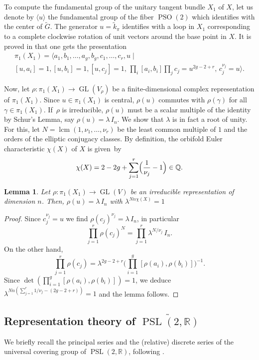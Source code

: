 \documentclass[JEP,XML,SOM,Unicode,NoFloatCountersInSection,published]{cedram}
\theoremstyle{plain}
\newtheorem{lem}[thm]{Lemma}
\theoremstyle{definition}
\theoremstyle{remark}
\newcommand{\R}{\mathbb{R}}
\newcommand{\Q}{\mathbb{Q}}
\DeclareMathOperator{\PSL}{PSL}
\DeclareMathOperator{\GL}{GL}
\DeclareMathOperator{\PSO}{PSO}
\numberwithin{equation}{section}
\begin{document}
To compute the fundamental group of the unitary tangent bundle $X_1$ of $X$, let us denote by $\langle u\rangle$ the fundamental group of the fiber $\PSO(2)$ which identifies with the center of $\widetilde{G}$. The generator $u=\widetilde{k}_\pi$ identifies with a loop in $X_1$ corresponding to a complete clockwise rotation of unit vectors around the base point in $X$. It is proved in \cite[\S 2]{fried1986fuchsian} that one gets the presentation
\begin{multline}\label{presentation}
\textstyle
\pi_1(X_1) = \bigl\langle a_1, b_1, \ldots, a_g, b_g, c_1, \ldots, c_r, u \mid \\ [u,a_i] =1, [u,b_i]=1, [u,c_j]=1, \, \prod_i[a_i,b_i]\prod_j c_j = u^{2g-2+r}, \, c_j^{\nu_j}=u \bigr\rangle.
\end{multline}

Now, let $\rho:\pi_1(X_1)\to\GL(V_\rho)$ be a finite-dimensional complex representation of $\pi_1(X_1)$. Since $u\in\pi_1(X_1)$ is central, $\rho(u)$ commutes with $\rho(\gamma)$ for all $\gamma\in\pi_1(X_1)$. If~$\rho$ is irreducible, $\rho(u)$ must be a scalar multiple of the identity by Schur's Lemma, say $\rho(u)=\lambda\,I_n$. We show that $\lambda$ is in fact a root of unity. For this, let $N = \operatorname{lcm}(1, \nu_1, \ldots, \nu_r)$ be the least common multiple of $1$ and the orders of the elliptic conjugacy classes. By definition, the orbifold Euler characteristic $\chi(X)$ of $X$ is given~by
\[
\chi(X) = 2-2g+\sum_{j=1}^r\Bigl(\frac 1 {\nu_j}-1\Bigr) \in \Q.
\]

\begin{lem}\label{lem:CenterActionIrredPi1X1}
Let $\rho\colon \pi_1(X_1) \to \GL(V)$ be an irreducible representation of dimension $n$. Then, $\rho(u) =\lambda\, I_n$ with $\lambda^{Nn\chi(X)}=1$
\end{lem}

\begin{proof}
Since $c_j^{\nu_j}=u$ we find
$\rho(c_j)^{\nu_j}= \lambda \, I_n$, in particular
\[
\prod_{j=1}^r \rho(c_j)^N = \prod_{j=1}^r \lambda ^{N/\nu_j} \, I_n.
\]
On the other hand,
\[
\prod_{j=1}^r \rho(c_j) = \lambda^{2g-2+r} \biggl(\prod_{i=1}^g[\rho(a_i),\rho(b_i)]\biggr)^{-1}.
\]
Since $\det(\prod_{i=1}^g[\rho(a_i),\rho(b_i)]) = 1$, we deduce
$\lambda^{Nn \left(\sum_{j=1}^r 1/\nu_j - (2g-2+r)\right)} = 1$
and the lemma follows.
\end{proof}

\subsection{Representation theory of $\widetilde{\PSL(2,\R)}$}
\label{subsec:RepTheory}
We briefly recall the principal series and the (relative) discrete series of the universal covering group of $\PSL(2,\R)$, following \cite[\S 1]{Hof94}.
\end{document}
